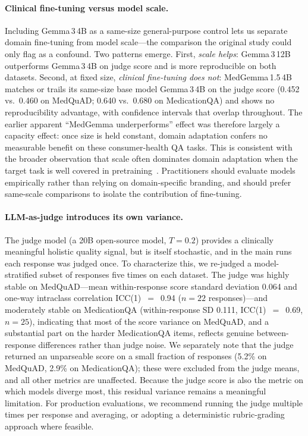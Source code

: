 \documentclass[11pt]{article}
\begin{document}
\paragraph{Clinical fine-tuning versus model scale.}
Including Gemma\,3\,4B as a same-size general-purpose control lets us
separate domain fine-tuning from model scale---the comparison the
original study could only flag as a confound. Two patterns emerge.
First, \emph{scale helps}: Gemma\,3\,12B outperforms Gemma\,3\,4B on
judge score and is more reproducible on both datasets. Second, at fixed
size, \emph{clinical fine-tuning does not}: MedGemma\,1.5\,4B matches or
trails its same-size base model Gemma\,3\,4B on the judge score (0.452
vs.\ 0.460 on MedQuAD; 0.640 vs.\ 0.680 on MedicationQA) and shows no
reproducibility advantage, with confidence intervals that overlap
throughout. The earlier apparent ``MedGemma underperforms'' effect was
therefore largely a capacity effect: once size is held constant, domain
adaptation confers no measurable benefit on these consumer-health QA
tasks.
This is consistent with the broader observation that scale often
dominates domain adaptation when the target task is well covered in
pretraining~\cite{singhal2023large, nori2023gpt4med}.
Practitioners should evaluate models empirically rather than relying
on domain-specific branding, and should prefer same-scale comparisons
to isolate the contribution of fine-tuning.

\paragraph{LLM-as-judge introduces its own variance.}
The judge model (a 20B open-source model, $T{=}0.2$) provides a
clinically meaningful holistic quality signal, but is itself
stochastic, and in the main runs each response was judged once.
To characterize this, we re-judged a model-stratified subset of
responses five times on each dataset. The judge was highly stable on
MedQuAD---mean within-response score standard deviation 0.064 and
one-way intraclass correlation ICC(1)~$=$~0.94 ($n{=}22$
responses)---and moderately stable on MedicationQA (within-response SD
0.111, ICC(1)~$=$~0.69, $n{=}25$), indicating that most of the score
variance on MedQuAD, and a substantial part on the harder MedicationQA
items, reflects genuine between-response differences rather than judge
noise. We separately note that the judge returned an unparseable score
on a small fraction of responses (5.2\% on MedQuAD, 2.9\% on
MedicationQA); these were excluded from the judge means, and all other
metrics are unaffected. Because the judge score is also the metric on
which models diverge most, this residual variance remains a meaningful
limitation.
For production evaluations, we recommend running the judge multiple
times per response and averaging, or adopting a deterministic
rubric-grading approach where feasible.
\end{document}
